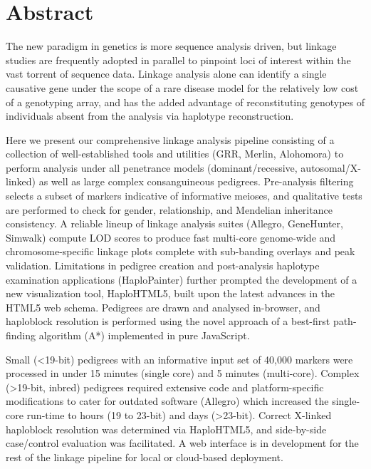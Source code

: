 \chapter*{Abstract}

\vspace{15pt}
\begin{spacing}{1.4}
The new paradigm in genetics is more sequence analysis driven, but linkage studies are frequently adopted in parallel to pinpoint loci of interest within the vast torrent of sequence data. Linkage analysis alone can identify a single causative gene under the scope of a rare disease model for the relatively low cost of a genotyping array, and has the added advantage of reconstituting genotypes of individuals absent from the analysis via haplotype reconstruction.

Here we present our comprehensive linkage analysis pipeline consisting of a collection of well-established tools and utilities (GRR, Merlin, Alohomora) to perform analysis under all penetrance models (dominant/recessive, autosomal/X-linked) as well as large complex consanguineous pedigrees. Pre-analysis filtering selects a subset of markers indicative of informative meioses, and qualitative tests are performed to check for gender, relationship, and Mendelian inheritance consistency. A reliable lineup of linkage analysis suites (Allegro, GeneHunter, Simwalk) compute LOD scores to produce fast multi-core genome-wide and chromosome-specific linkage plots complete with sub-banding overlays and peak validation. Limitations in pedigree creation and post-analysis haplotype examination applications (HaploPainter) further prompted the development of a new  visualization tool,  HaploHTML5,  built upon the latest advances in the HTML5 web schema. Pedigrees are drawn and analysed in-browser, and haploblock resolution is performed using the novel approach of a best-first path-finding algorithm (A*) implemented in pure JavaScript.

Small (<19-bit) pedigrees with an informative input set of 40,000 markers were processed in under 15 minutes (single core) and 5 minutes (multi-core). Complex (>19-bit, inbred) pedigrees required extensive code and platform-specific modifications to cater for outdated software (Allegro) which increased the single-core run-time to hours (19 to 23-bit) and days (>23-bit). Correct X-linked haploblock resolution was determined via HaploHTML5, and side-by-side case/control evaluation was facilitated.  A web interface is in development for the rest of the linkage pipeline for local or cloud-based deployment.
\end{spacing}